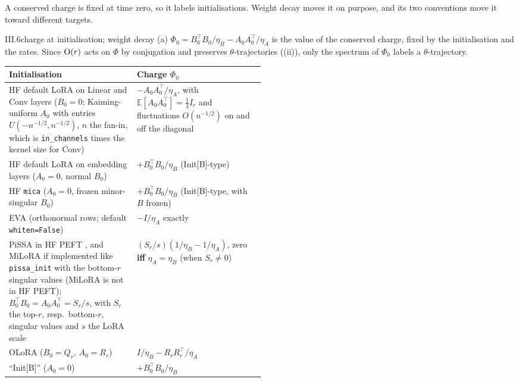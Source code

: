 A conserved charge is fixed at time zero, so it labels initialisations. Weight decay moves it on purpose, and its two conventions move it toward different targets.

\begin{corollary}{III.6}{charge at initialisation; weight decay}
(a) $\Phi_0=B_0^\top B_0/\eta_B-A_0A_0^\top/\eta_A$ is the value of the conserved charge, fixed by the initialisation and the rates. Since $\mathrm{O}(r)$ acts on $\Phi$ by conjugation and preserves $\theta$-trajectories ((ii)), only the spectrum of $\Phi_0$ labels a $\theta$-trajectory.

\smallskip
{\upshape\small\renewcommand{\arraystretch}{1.12}\noindent
\begin{tabularx}{\linewidth}{@{}>{\raggedright\arraybackslash}p{0.5\linewidth}>{\raggedright\arraybackslash}X@{}}
\toprule\headrow
\textbf{Initialisation} & \textbf{Charge $\Phi_0$}\\
\midrule
HF default LoRA on Linear and Conv layers ($B_0=0$; Kaiming-uniform $A_0$ with entries $U(-n^{-1/2},n^{-1/2})$, $n$ the fan-in, which is \texttt{in\_channels} times the kernel size for Conv) & $-A_0A_0^\top/\eta_A$, with $\mathbb{E}[A_0A_0^\top]=\tfrac13I_r$ and fluctuations $O(n^{-1/2})$ on and off the diagonal\\
HF default LoRA on embedding layers ($A_0=0$, normal $B_0$) & $+B_0^\top B_0/\eta_B$ (Init[B]-type)\\
HF \texttt{mica} \citep{rudiger2026mica} ($A_0=0$, frozen minor-singular $B_0$) & $+B_0^\top B_0/\eta_B$ (Init[B]-type, with $B$ frozen)\\
EVA \citep{paischer2024parameter} (orthonormal rows; default \texttt{whiten=False}) & $-I/\eta_A$ exactly\\
PiSSA in HF PEFT \citep{meng2024pissa}, and MiLoRA \citep{wang2024milora} if implemented like \texttt{pissa\_init} with the bottom-$r$ singular values (MiLoRA is not in HF PEFT); $B_0^\top B_0=A_0A_0^\top=S_r/s$, with $S_r$ the top-$r$, resp.\ bottom-$r$, singular values and $s$ the LoRA scale & $(S_r/s)(1/\eta_B-1/\eta_A)$, zero \textbf{iff} $\eta_A=\eta_B$ (when $S_r\ne0$)\\
OLoRA \citep{buyukakyuz2024olora} ($B_0=Q_r$, $A_0=R_r$) & $I/\eta_B-R_rR_r^\top/\eta_A$\\
``Init[B]'' \citep{hayou2024impact} ($A_0=0$) & $+B_0^\top B_0/\eta_B$\\
\bottomrule
\end{tabularx}}
\smallskip


\end{corollary}
